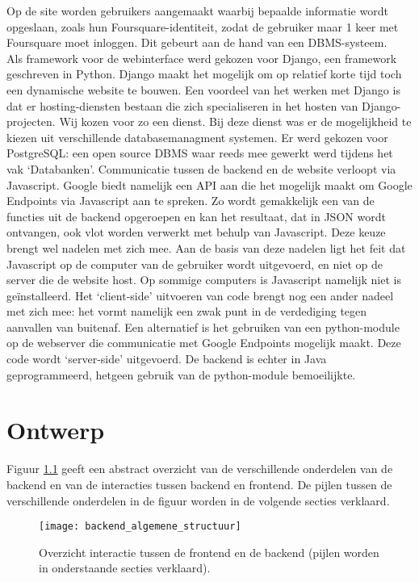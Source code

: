 Op de site worden gebruikers aangemaakt waarbij bepaalde informatie wordt opgeslaan, zoals hun Foursquare-identiteit, zodat de gebruiker maar 1 keer met Foursquare moet inloggen. Dit gebeurt aan de hand van een DBMS-systeem. \\

Als framework voor de webinterface werd gekozen voor Django, een framework geschreven in Python. Django maakt het mogelijk om op relatief korte tijd toch een dynamische website te bouwen.
Een voordeel van het werken met Django is dat er hosting-diensten bestaan die zich specialiseren in het hosten van Django-projecten. Wij kozen voor zo een dienst\cite{djangoeurope}.
Bij deze dienst was er de mogelijkheid te kiezen uit verschillende databasemanagment systemen. Er werd gekozen voor PostgreSQL: een open source DBMS waar reeds mee gewerkt werd tijdens het vak `Databanken'.
Communicatie tussen de backend en de website verloopt via Javascript. Google biedt namelijk een API aan die het mogelijk maakt om Google Endpoints via Javascript aan te spreken. Zo wordt gemakkelijk een van de functies uit de backend opgeroepen en kan het resultaat, dat in JSON wordt ontvangen, ook vlot worden verwerkt met behulp van Javascript. Deze keuze brengt wel nadelen met zich mee. Aan de basis van deze nadelen ligt het feit dat Javascript op de computer van de gebruiker wordt uitgevoerd, en niet op de server die de website host. Op sommige computers is Javascript namelijk niet is geïnstalleerd. Het `client-side' uitvoeren van code brengt nog een ander nadeel met zich mee: het vormt namelijk een zwak punt in de verdediging tegen aanvallen van buitenaf. Een alternatief is het gebruiken van een python-module op de webserver die communicatie met Google Endpoints mogelijk maakt. Deze code wordt `server-side' uitgevoerd. De backend is echter in Java geprogrammeerd, hetgeen gebruik van de python-module bemoeilijkte.

\chapter{Ontwerp}
Figuur \ref{fig:algemene structuur backend} geeft een abstract overzicht van de verschillende onderdelen van de backend en van de interacties tussen backend en frontend. De pijlen tussen de verschillende onderdelen in de figuur worden in de volgende secties verklaard.

\begin{figure}[H]
	\centering
	\texttt{[image: backend\_algemene\_structuur]}
	\caption{Overzicht interactie tussen de frontend en de backend (pijlen worden in onderstaande secties verklaard).}
	\label{fig:algemene structuur backend}
	
\end{figure}
